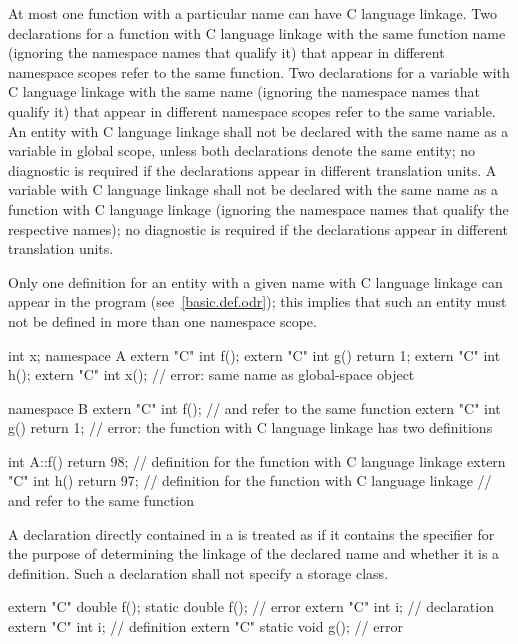 \pnum
{}%
At most one function with a particular name can have C language linkage.
Two declarations for a function with C language linkage with the same
function name (ignoring the namespace names that qualify it) that appear
in different namespace scopes refer to the same function. Two
declarations for a variable with C language linkage with the same name
(ignoring the namespace names that qualify it) that appear in different
namespace scopes refer to the same variable.
An entity with C language linkage shall not be declared with the same name
as a variable in global scope, unless both declarations denote the same entity;
no diagnostic is required if the declarations appear in different translation units.
A variable with C language linkage shall not be declared with the same name as a
function with C language linkage (ignoring the namespace names that qualify the
respective names); no diagnostic is required if the declarations appear in
different translation units.
\begin{note}
Only
one definition for an entity with a given name
with C language linkage can appear in the
program (see~\ref{basic.def.odr});
this implies that such an entity
must not be defined in more
than one namespace scope.
\end{note}
\begin{example}
\begin{codeblock}
int x;
namespace A {
  extern "C" int f();
  extern "C" int g() { return 1; }
  extern "C" int h();
  extern "C" int x();               // error: same name as global-space object 
}

namespace B {
  extern "C" int f();               //  and  refer to the same function
  extern "C" int g() { return 1; }  // error: the function  with C language linkage has two definitions
}

int A::f() { return 98; }           // definition for the function  with C language linkage
extern "C" int h() { return 97; }   // definition for the function  with C language linkage
                                    //  and  refer to the same function
\end{codeblock}
\end{example}

\pnum
A declaration directly contained in a
is treated as if it contains the
specifier for the purpose of determining the linkage of the
declared name and whether it is a definition. Such a declaration shall
not specify a storage class.
\begin{example}
\begin{codeblock}
extern "C" double f();
static double f();                  // error
extern "C" int i;                   // declaration
extern "C" {
  int i;                            // definition
}
extern "C" static void g();         // error
\end{codeblock}
\end{example}

